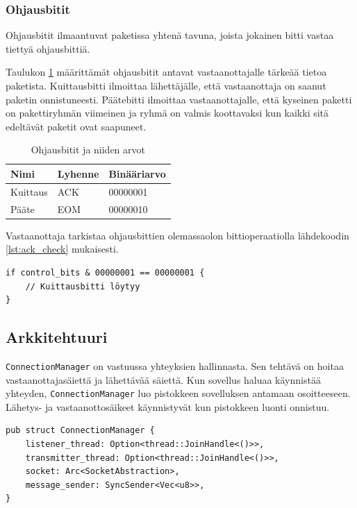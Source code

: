 \documentclass[a4paper,12pt]{article}
\begin{document}
    \subsubsection{Ohjausbitit}\label{subsec:control_bits}
    Ohjausbitit ilmaantuvat paketissa yhtenä tavuna, joista jokainen bitti vastaa tiettyä ohjausbittiä.

    Taulukon \ref{tab:control_bits} määrittämät ohjausbitit antavat vastaanottajalle tärkeää tietoa paketista. Kuittausbitti ilmoittaa lähettäjälle, että vastaanottaja on saanut paketin onnistuneesti. Päätebitti ilmoittaa vastaanottajalle, että kyseinen paketti on pakettiryhmän viimeinen ja ryhmä on valmis koottavaksi kun kaikki sitä edeltävät paketit ovat saapuneet. \par
    
    \begin{table}[h!]
        \centering
        \begin{tabular}{lll}
            Nimi     & Lyhenne & Binääriarvo \\
            \hline
            Kuittaus & ACK     & 00000001    \\
            Pääte    & EOM     & 00000010    \\
        \end{tabular}
        \caption{Ohjausbitit ja niiden arvot}
        \label{tab:control_bits}
    \end{table}


    Vastaanottaja tarkistaa ohjausbittien olemassaolon bittioperaatiolla lähdekoodin \ref{lst:ack_check} mukaisesti.
    \begin{lstlisting}[caption={Kuittasbitin tarkistus ohjausbiteistä}, label={lst:ack_check}]
if control_bits & 00000001 == 00000001 {
    // Kuittausbitti löytyy
}\end{lstlisting}

    \subsection{Arkkitehtuuri}\label{sec:arkkitehtuuri}
    \architecture

    \lstinline{ConnectionManager} on vastuussa yhteyksien hallinnasta. Sen tehtävä on
    hoitaa vastaanottajasäiettä ja lähettävää säiettä. Kun sovellus haluaa käynnistää yhteyden,
    \lstinline{ConnectionManager} luo pistokkeen sovelluksen antamaan osoitteeseen.
    Lähetys- ja vastaanottosäikeet käynnistyvät kun pistokkeen luonti onnistuu.
    \par
    \begin{lstlisting}[caption={ConnectionManager rakenne}, label={lst:connectionmanager}]
pub struct ConnectionManager {
    listener_thread: Option<thread::JoinHandle<()>>,
    transmitter_thread: Option<thread::JoinHandle<()>>,
    socket: Arc<SocketAbstraction>,
    message_sender: SyncSender<Vec<u8>>,
}\end{lstlisting}
\end{document}
